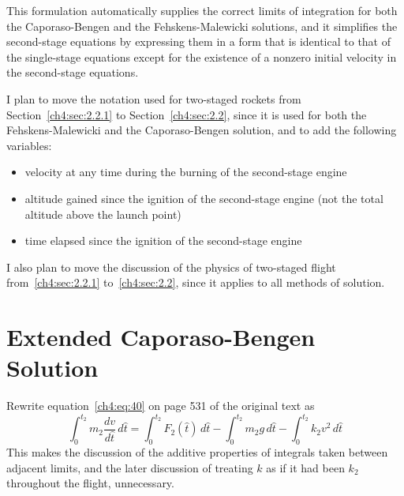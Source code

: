 This formulation automatically supplies the correct limits of integration for both the Caporaso-Bengen and
the Fehskens-Malewicki solutions, and it simplifies the second-stage equations by expressing them in a form
that is identical to that of the single-stage equations except for the existence of a nonzero initial
velocity in the second-stage equations.

I plan to move the notation used for two-staged rockets from Section~\ref{ch4:sec:2.2.1} to
Section~\ref{ch4:sec:2.2}, since it is used for both the Fehskens-Malewicki and the Caporaso-Bengen
solution, and to add the following variables:
\begin{itemize}[nosep,leftmargin=4em,labelwidth=3em,labelsep=0.35em,align=right]%
  \item[$v$ =] velocity at any time during the burning of the second-stage engine
  \item[$\hat{y}$ =] altitude gained since the ignition of the second-stage engine (not the total altitude
  above the launch point)
  \item[$\hat{t}$ =] time elapsed since the ignition of the second-stage engine
\end{itemize}

I also plan to move the discussion of the physics of two-staged flight from~\ref{ch4:sec:2.2.1}
to~\ref{ch4:sec:2.2}, since it applies to all methods of solution.

\section*{Extended Caporaso-Bengen Solution}\label{supp:ch4-summary:cb}

Rewrite equation~\eqref{ch4:eq:40} on page 531 of the original text as
\begin{equation*}
\int_{0}^{t_2} m_2\frac{dv}{d\hat{t}}\,d\hat{t} = \int_{0}^{t_2} F_2(\hat{t})\,d\hat{t}
  - \int_{0}^{t_2} m_2g\,d\hat{t} - \int_{0}^{t_2} k_2v^{2}\,d\hat{t}
\end{equation*}
This makes the discussion of the additive properties of integrals taken between adjacent limits, and the
later discussion of treating $k$ as if it had been $k_2$ throughout the flight, unnecessary.

